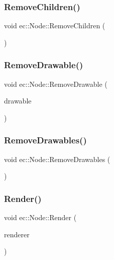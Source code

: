 \mbox{\label{classec_1_1_node_ae91a96819729bc06c17870fa8cca2129}} 
\subsubsection{\texorpdfstring{Remove\+Children()}{RemoveChildren()}}
{\footnotesize\ttfamily void ec\+::\+Node\+::\+Remove\+Children (\begin{DoxyParamCaption}{ }\end{DoxyParamCaption})}

\mbox{\label{classec_1_1_node_acd641d3927ae368628ac90d5d79597d9}} 
\subsubsection{\texorpdfstring{Remove\+Drawable()}{RemoveDrawable()}}
{\footnotesize\ttfamily void ec\+::\+Node\+::\+Remove\+Drawable (\begin{DoxyParamCaption}\item[{\mbox{\hyperlink{classec_1_1_drawable}{Drawable}} $\ast$}]{drawable }\end{DoxyParamCaption})}

\mbox{\label{classec_1_1_node_ad874f229d3602ac6f0d0f0ce502a1fbc}} 
\subsubsection{\texorpdfstring{Remove\+Drawables()}{RemoveDrawables()}}
{\footnotesize\ttfamily void ec\+::\+Node\+::\+Remove\+Drawables (\begin{DoxyParamCaption}{ }\end{DoxyParamCaption})}

\mbox{\label{classec_1_1_node_ac606be4f6d5a899a0b9679b6767ff109}} 
\subsubsection{\texorpdfstring{Render()}{Render()}}
{\footnotesize\ttfamily void ec\+::\+Node\+::\+Render (\begin{DoxyParamCaption}\item[{\mbox{\hyperlink{classec_1_1_scene_renderer}{Scene\+Renderer}} \&}]{renderer }\end{DoxyParamCaption})\hspace{0.3cm}{\ttfamily [virtual]}}

